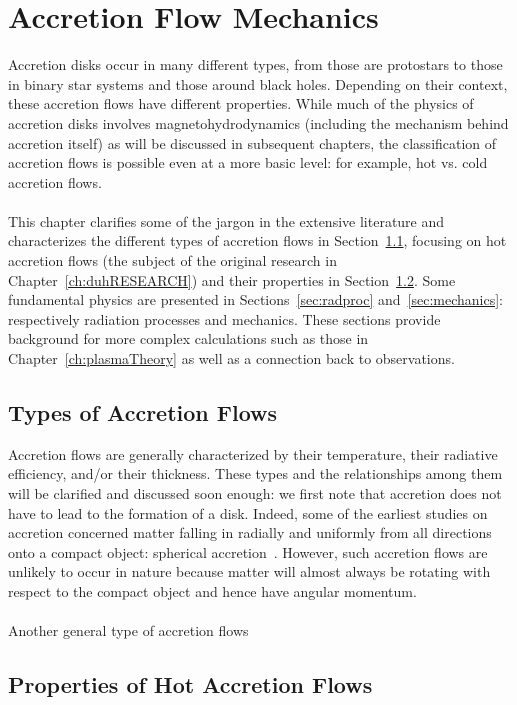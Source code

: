 \chapter{Accretion Flow Mechanics}
Accretion disks occur in many different types, from those are protostars to those in binary star systems and those around black holes. Depending on their context, these accretion flows have different properties. While much of the physics of accretion disks involves magnetohydrodynamics (including the mechanism behind accretion itself) as will be discussed in subsequent chapters, the classification of accretion flows is possible even at a more basic level: for example, hot vs. cold accretion flows.\\
\\
This chapter clarifies some of the jargon in the extensive literature and characterizes the different types of accretion flows in Section~\ref{sec:typesAF}, focusing on hot accretion flows (the subject of the original research in Chapter~\ref{ch:duhRESEARCH}) and their properties in Section~\ref{sec:propertiesAF}. Some fundamental physics are presented in Sections~\ref{sec:radproc} and~\ref{sec:mechanics}: respectively radiation processes and mechanics. These sections provide background for more complex calculations such as those in Chapter~\ref{ch:plasmaTheory} as well as a connection back to observations. 

\section{Types of Accretion Flows} \label{sec:typesAF}
Accretion flows are generally characterized by their temperature, their radiative efficiency, and/or their thickness. These types and the relationships among them will be clarified and discussed soon enough: we first note that accretion does not have to lead to the formation of a disk. Indeed, some of the earliest studies on accretion concerned matter falling in radially and uniformly from all directions onto a compact object: spherical accretion~\cite{Bondi?}. However, such accretion flows are unlikely to occur in nature because matter will almost always be rotating with respect to the compact object and hence have angular momentum. \\
\\
Another general type of accretion flows


\section{Properties of Hot Accretion Flows} \label{sec:propertiesAF}

